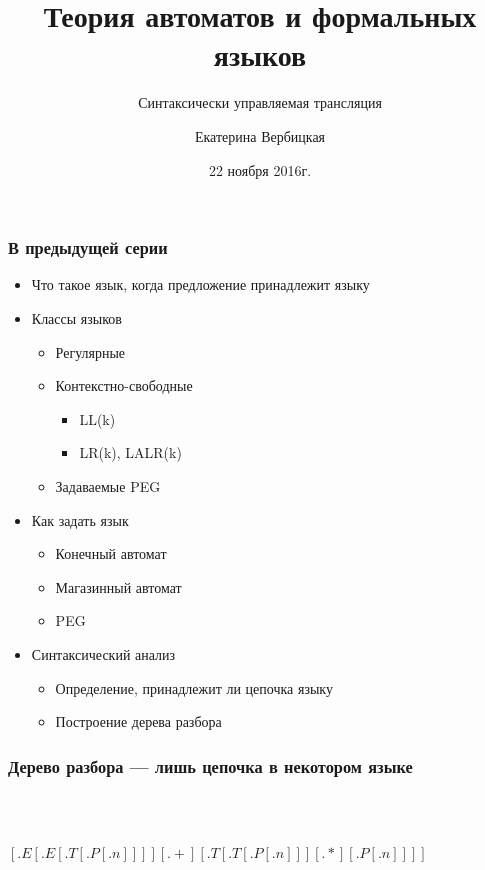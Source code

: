 \documentclass{beamer}
\title[]{Теория автоматов и формальных языков}
\subtitle[]{Синтаксически управляемая трансляция}
\institute[]{
Санкт-Петербургский государственный электротехнический университет <<ЛЭТИ>>\\
}
\author[]{Екатерина Вербицкая}
\date{22 ноября 2016г.}
\begin{document}
{
  \begin{frame}
    \titlepage
  \end{frame}
}

\begin{frame}[fragile]
  \transwipe[direction=90]
  \frametitle{В предыдущей серии}
  \begin{itemize}
    \item Что такое язык, когда предложение принадлежит языку
    \item Классы языков
    \begin{itemize}
	  \item Регулярные
	  \item Контекстно-свободные
	  \begin{itemize}
	    \item LL(k)
	    \item LR(k), LALR(k)
	  \end{itemize}
	  \item Задаваемые PEG   
    \end{itemize}     
    \item Как задать язык
    \begin{itemize}
      \item Конечный автомат
      \item Магазинный автомат
      \item PEG
    \end{itemize}
    \item Синтаксический анализ
    \begin{itemize}
      \item Определение, принадлежит ли цепочка языку
      \item Построение дерева разбора
    \end{itemize}
  \end{itemize}
\end{frame}

\begin{frame}[fragile]
  \transwipe[direction=90]
  \frametitle{Дерево разбора --- лишь цепочка в некотором языке }
\begin{center}
  \pause
  
  ~\\~
  
$[.E [.E [.T [.P [.n ] ] ] ] [.+ ] [.T [.T [.P [.n ] ] ] [.* ] [.P [.n ] ] ] ]$  
\end{center}  
\end{frame}
\end{document}
